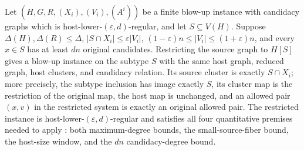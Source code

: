 \begin{lemma}
Let $(H,G,R,(X_i),(V_i),(A^i))$ be a finite blow-up instance with candidacy graphs which is host-lower-$(\varepsilon,d)$-regular, and let $S\subseteq V(H)$.  Suppose $\Delta(H),\Delta(R)\leq\Delta$, $|S\cap X_i|\leq\varepsilon|V_i|$, $(1-\varepsilon)n\leq|V_i|\leq(1+\varepsilon)n$, and every $x\in S$ has at least $dn$ original candidates.  Restricting the source graph to $H[S]$ gives a blow-up instance on the subtype $S$ with the same host graph, reduced graph, host clusters, and candidacy relation.  Its source cluster is exactly $S\cap X_i$; more precisely, the subtype inclusion has image exactly $S$, its cluster map is the restriction of the original map, the host map is unchanged, and an allowed pair $(x,v)$ in the restricted system is exactly an original allowed pair.  The restricted instance is host-lower-$(\varepsilon,d)$-regular and satisfies all four quantitative premises needed to apply : both maximum-degree bounds, the small-source-fiber bound, the host-size window, and the $dn$ candidacy-degree bound.
\end{lemma}
